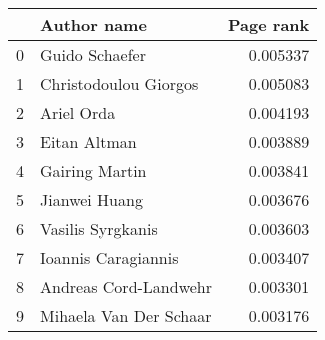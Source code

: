 \begin{tabular}{llr}
\toprule
{} &              Author name &  Page rank \\
\midrule
0 &           Guido Schaefer &   0.005337 \\
1 &   Christodoulou  Giorgos &   0.005083 \\
2 &               Ariel Orda &   0.004193 \\
3 &             Eitan Altman &   0.003889 \\
4 &          Gairing  Martin &   0.003841 \\
5 &            Jianwei Huang &   0.003676 \\
6 &        Vasilis Syrgkanis &   0.003603 \\
7 &      Ioannis Caragiannis &   0.003407 \\
8 &    Andreas Cord-Landwehr &   0.003301 \\
9 &   Mihaela Van Der Schaar &   0.003176 \\
\bottomrule
\end{tabular}
